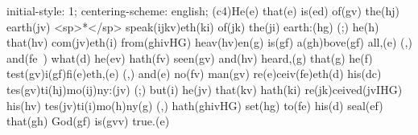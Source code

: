 initial-style: 1;
centering-scheme: english;
(c4)He(e) that(e) is(ed) of(gv) the(hj) earth(jv) <sp>*</sp> speak(ijkv)eth(ki) of(jk) the(ji) earth:(hg) (;) he(h) that(hv) com(jv)eth(i) from(ghivHG) heav(hv)en(g) is(gf) a(gh)bove(gf) all,(e) (,) and(fe~) what(d) he(ev) hath(fv) seen(gv) and(hv) heard,(g) that(g) he(f) test(gv)i(gf)fi(e)eth,(e) (,) and(e) no(fv) man(gv) re(e)ceiv(fe)eth(d) his(dc) tes(gv)ti(hj)mo(ij)ny:(jv) (;) but(i) he(jv) that(kv) hath(ki) re(jk)ceived(jvIHG) his(hv) tes(jv)ti(i)mo(h)ny(g) (,) hath(ghivHG) set(hg) to(fe) his(d) seal(ef) that(gh) God(gf) is(gvv) true.(e)
